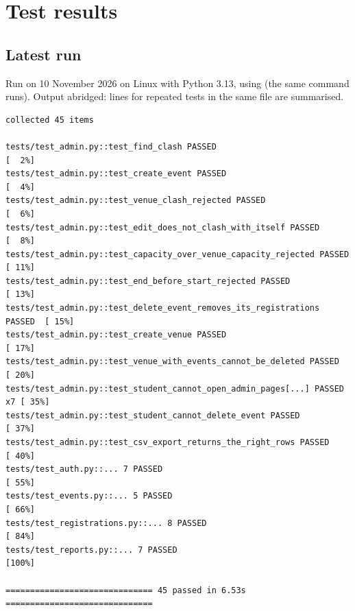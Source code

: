 \documentclass[11pt,a4paper]{article}
\begin{document}
\section{Test results}
\label{sec:results}

\subsection{Latest run}

Run on 10 November 2026 on Linux with Python 3.13, using 
(the same command  runs). Output abridged: lines for repeated tests in the same file are summarised.

\begin{verbatim}
collected 45 items

tests/test_admin.py::test_find_clash PASSED                              [  2%]
tests/test_admin.py::test_create_event PASSED                            [  4%]
tests/test_admin.py::test_venue_clash_rejected PASSED                    [  6%]
tests/test_admin.py::test_edit_does_not_clash_with_itself PASSED         [  8%]
tests/test_admin.py::test_capacity_over_venue_capacity_rejected PASSED   [ 11%]
tests/test_admin.py::test_end_before_start_rejected PASSED               [ 13%]
tests/test_admin.py::test_delete_event_removes_its_registrations PASSED  [ 15%]
tests/test_admin.py::test_create_venue PASSED                            [ 17%]
tests/test_admin.py::test_venue_with_events_cannot_be_deleted PASSED     [ 20%]
tests/test_admin.py::test_student_cannot_open_admin_pages[...] PASSED x7 [ 35%]
tests/test_admin.py::test_student_cannot_delete_event PASSED             [ 37%]
tests/test_admin.py::test_csv_export_returns_the_right_rows PASSED       [ 40%]
tests/test_auth.py::... 7 PASSED                                         [ 55%]
tests/test_events.py::... 5 PASSED                                       [ 66%]
tests/test_registrations.py::... 8 PASSED                                [ 84%]
tests/test_reports.py::... 7 PASSED                                      [100%]

============================== 45 passed in 6.53s ==============================
\end{verbatim}
\end{document}
